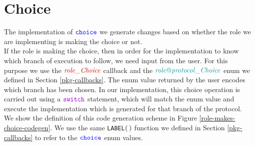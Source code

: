 \documentclass[12pt,twoside]{report}
\begin{document}
            
            
            
            


\section{Choice}\label{choice-impl}
The implementation of ${\color{blue}\mathtt{choice}}$ we generate changes based on whether the role we are implementing is making the choice or not.\\

If the role is making the choice, then in order for the implementation to know which branch of execution to follow, we need input from the user. For this purpose we use the $\functionname{role\_Choice}$ callback and the $\enumtype{role@protocol\_Choice}$ enum we defined in Section \ref{pkg-callbacks}. The enum value returned by the user encodes which branch has been chosen. In our implementation, this choice operation is carried out using a $\goswitch$ statement, which will match the enum value and execute the implementation which is generated for that branch of the protocol. We show the definition of this code generation scheme in Figure \ref{role-makes-choice-codegen}. We use the same \texttt{LABEL}$(\,)$ function we defined in Section \ref{pkg-callbacks} to refer to the ${\color{blue}\mathtt{choice}}$ enum values.\\
\end{document}
